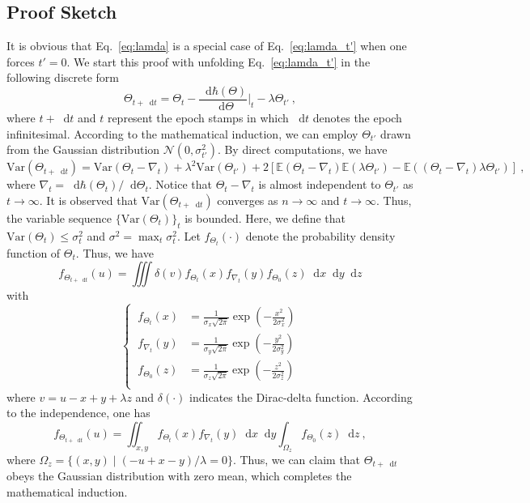 \documentclass[review,10pt]{JMtemplate}
\newcommand*{\dif}{\mathop{}\!\mathrm{d}}
\begin{document}
\subsection{Proof Sketch}  \label{subsec:proof}
It is obvious that Eq.~\eqref{eq:lamda} is a special case of Eq.~\eqref{eq:lamda_t'} when one forces $t'=0$. We start this proof with unfolding Eq.~\eqref{eq:lamda_t'} in the following discrete form
\[
\Theta_{t+ \dif t} = \Theta_t  -  \frac{\dif \hbar(\Theta)}{\dif \Theta} \Big|_t - \lambda \Theta_{t'} \ ,
\]
where $t+\dif t$ and $t$ represent the epoch stamps in which $\dif t$ denotes the epoch infinitesimal. According to the mathematical induction, we can employ $\Theta_{t'}$ drawn from the Gaussian distribution $\mathcal{N}(0,\sigma_{t'}^2)$. By direct computations, we have
\[
\mathrm{Var} \left( \Theta_{t+ \dif t} \right) = \textrm{Var} \left( \Theta_t  -  \nabla_t \right) + \lambda^2 \textrm{Var} \left(  \Theta_{t'}  \right) 
+ 2 \left[  \mathbb{E} \left( \Theta_t  -  \nabla_t \right) \mathbb{E} \left( \lambda \Theta_{t'}  \right) - \mathbb{E} \left( (\Theta_t  -  \nabla_t ) \lambda \Theta_{t'}  \right)  \right] \ ,    
\]
where $ \nabla_t = {\dif \hbar(\Theta_t)}/{\dif \Theta_t}$. Notice that $\Theta_t  -  \nabla_t$ is almost independent to $\Theta_{t'}$ as $t \to \infty$. It is observed that $\mathrm{Var} ( \Theta_{t+ \dif t} ) $ converges as $n \to \infty$ and $t \to \infty$. Thus, the variable sequence $\{ \mathrm{Var}(\Theta_t) \}_t$ is bounded. Here, we define that $\mathrm{Var} ( \Theta_{t} ) \leq \sigma_t^2$ and $\sigma^2 = \max_t \sigma_t^2$. Let $f_{\Theta_t}(\cdot)$ denote the probability density function of $\Theta_t$. Thus, we have
\begin{equation}  \label{eq:f_theta}
	f_{\Theta_{t+\dif t}}( u )  = \iiint \delta(  v  ) f_{\Theta_t}(x) f_{\nabla_t}(y)  f_{\Theta_0} (z) \dif x\! \dif y\! \dif z 
\end{equation}
with
\[
\left\{~ \begin{aligned}
    f_{\Theta_t}(x) &= \frac{1}{\sigma_x \sqrt{2\pi}} \exp \left( -\frac{x^2}{2\sigma_x^2} \right)   \\
    f_{\nabla_t}(y) &= \frac{1}{\sigma_y \sqrt{2\pi}} \exp \left( -\frac{y^2}{2\sigma_y^2} \right)  \\
    f_{\Theta_0} (z) &=  \frac{1}{\sigma_z \sqrt{2\pi}} \exp \left( -\frac{z^2}{2 \sigma_z^2} \right) \\
\end{aligned}\right.
\]
where $v= u- x + y  + \lambda z $ and $\delta(\cdot)$ indicates the Dirac-delta function. According to the independence, one has
\begin{equation}  \label{eq:f_theta_unfold}
   f_{\Theta_{t+\dif t}}( u ) = \iint_{x,y}  f_{\Theta_t}(x) f_{\nabla_t}(y) \dif x\! \dif y  \int_{\Omega_z} f_{\Theta_0} (z) \dif z \ ,
\end{equation}
where $\Omega_z = \{ (x,y) \mid (-u+x-y)/ \lambda = 0 \}$. Thus, we can claim that $\Theta_{t+\dif t}$ obeys the Gaussian distribution with zero mean, which completes the mathematical induction.
\end{document}
